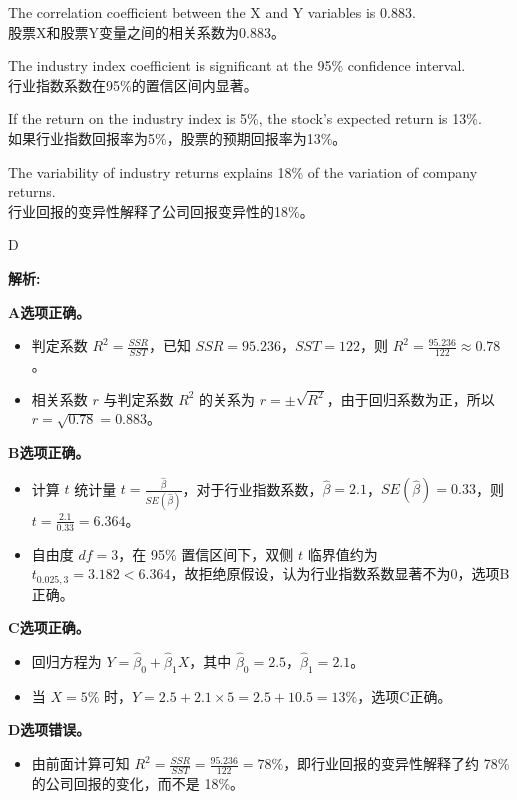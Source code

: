\documentclass{article}
\newenvironment{explanation}
{\textbf{解析:}\par}
{\par}
\begin{document}
\begin{choices}
    \item The correlation coefficient between the X and Y variables is 0.883.\\
    股票X和股票Y变量之间的相关系数为0.883。
    \item The industry index coefficient is significant at the 95\% confidence interval.\\
    行业指数系数在95\%的置信区间内显著。
    \item If the return on the industry index is 5\%, the stock's expected return is 13\%.\\
    如果行业指数回报率为5\%，股票的预期回报率为13\%。
    \item The variability of industry returns explains 18\% of the variation of company returns.\\
    行业回报的变异性解释了公司回报变异性的18\%。
\end{choices}

\begin{correctanswer}
    D
\end{correctanswer}

\begin{explanation}
\textbf{A选项正确。}
\begin{itemize}
    \item 判定系数 \(R^{2}=\frac{SSR}{SST}\)，已知 \(SSR = 95.236\)，\(SST = 122\)，则 \(R^{2}=\frac{95.236}{122}\approx0.78\)。
    \item 相关系数 \(r\) 与判定系数 \(R^{2}\) 的关系为 \(r=\pm\sqrt{R^{2}}\)，由于回归系数为正，所以 \(r=\sqrt{0.78}=0.883\)。
\end{itemize}
\textbf{B选项正确。}
\begin{itemize}
    \item 计算 \(t\) 统计量 \(t=\frac{\hat{\beta}}{SE(\hat{\beta})}\)，对于行业指数系数，\(\hat{\beta}=2.1\)，\(SE(\hat{\beta}) = 0.33\)，则 \(t=\frac{2.1}{0.33}=6.364\)。
    \item 自由度 \(df = 3\)，在 95\% 置信区间下，双侧 \(t\) 临界值约为 \(t_{0.025,3}=3.182 <6.364\)，故拒绝原假设，认为行业指数系数显著不为0，选项B正确。
\end{itemize}
\textbf{C选项正确。}
\begin{itemize}
    \item 回归方程为 \(Y=\hat{\beta}_{0}+\hat{\beta}_{1}X\)，其中 \(\hat{\beta}_{0}=2.5\)，\(\hat{\beta}_{1}=2.1\)。
    \item 当 \(X = 5\%\) 时，\(Y=2.5+2.1\times5=2.5 + 10.5 = 13\%\)，选项C正确。
\end{itemize}
\textbf{D选项错误。}
\begin{itemize}
    \item 由前面计算可知 \(R^{2}=\frac{SSR}{SST}=\frac{95.236}{122}=78\%\)，即行业回报的变异性解释了约 78\% 的公司回报的变化，而不是 18\%。
\end{itemize}
\end{explanation}
\end{document}
